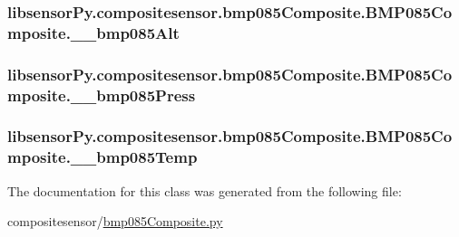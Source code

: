 \subsubsection[{\+\_\+\+\_\+bmp085\+Alt}]{\setlength{\rightskip}{0pt plus 5cm}libsensor\+Py.\+compositesensor.\+bmp085\+Composite.\+B\+M\+P085\+Composite.\+\_\+\+\_\+bmp085\+Alt\hspace{0.3cm}{\ttfamily [private]}}\label{classlibsensorPy_1_1compositesensor_1_1bmp085Composite_1_1BMP085Composite_a965bb2ed85b263eae7194176b9ade636}
\hypertarget{classlibsensorPy_1_1compositesensor_1_1bmp085Composite_1_1BMP085Composite_a7785b8f75c5cdaa8e3f2ca44c09e15d7}{}
\subsubsection[{\+\_\+\+\_\+bmp085\+Press}]{\setlength{\rightskip}{0pt plus 5cm}libsensor\+Py.\+compositesensor.\+bmp085\+Composite.\+B\+M\+P085\+Composite.\+\_\+\+\_\+bmp085\+Press\hspace{0.3cm}{\ttfamily [private]}}\label{classlibsensorPy_1_1compositesensor_1_1bmp085Composite_1_1BMP085Composite_a7785b8f75c5cdaa8e3f2ca44c09e15d7}
\hypertarget{classlibsensorPy_1_1compositesensor_1_1bmp085Composite_1_1BMP085Composite_a4f6af67b067a5f7b62f298b4491636e1}{}
\subsubsection[{\+\_\+\+\_\+bmp085\+Temp}]{\setlength{\rightskip}{0pt plus 5cm}libsensor\+Py.\+compositesensor.\+bmp085\+Composite.\+B\+M\+P085\+Composite.\+\_\+\+\_\+bmp085\+Temp\hspace{0.3cm}{\ttfamily [private]}}\label{classlibsensorPy_1_1compositesensor_1_1bmp085Composite_1_1BMP085Composite_a4f6af67b067a5f7b62f298b4491636e1}


The documentation for this class was generated from the following file\+:\begin{DoxyCompactItemize}
\item 
compositesensor/\hyperlink{compositesensor_2bmp085Composite_8py}{bmp085\+Composite.\+py}\end{DoxyCompactItemize}
